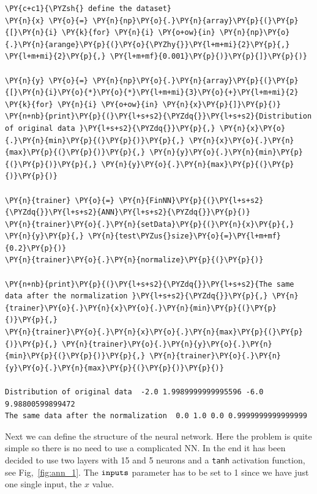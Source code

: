 \begin{tcolorbox}[breakable, size=fbox, boxrule=1pt, pad at break*=1mm,colback=cellbackground, colframe=cellborder]
\begin{Verbatim}[commandchars=\\\{\}]
\PY{c+c1}{\PYZsh{} define the dataset}
\PY{n}{x} \PY{o}{=} \PY{n}{np}\PY{o}{.}\PY{n}{array}\PY{p}{(}\PY{p}{[}\PY{n}{i} \PY{k}{for} \PY{n}{i} \PY{o+ow}{in} \PY{n}{np}\PY{o}{.}\PY{n}{arange}\PY{p}{(}\PY{o}{\PYZhy{}}\PY{l+m+mi}{2}\PY{p}{,} \PY{l+m+mi}{2}\PY{p}{,} \PY{l+m+mf}{0.001}\PY{p}{)}\PY{p}{]}\PY{p}{)}
	
\PY{n}{y} \PY{o}{=} \PY{n}{np}\PY{o}{.}\PY{n}{array}\PY{p}{(}\PY{p}{[}\PY{n}{i}\PY{o}{*}\PY{o}{*}\PY{l+m+mi}{3}\PY{o}{+}\PY{l+m+mi}{2} \PY{k}{for} \PY{n}{i} \PY{o+ow}{in} \PY{n}{x}\PY{p}{]}\PY{p}{)}
\PY{n+nb}{print}\PY{p}{(}\PY{l+s+s2}{\PYZdq{}}\PY{l+s+s2}{Distribution of original data }\PY{l+s+s2}{\PYZdq{}}\PY{p}{,} \PY{n}{x}\PY{o}{.}\PY{n}{min}\PY{p}{(}\PY{p}{)}\PY{p}{,} \PY{n}{x}\PY{o}{.}\PY{n}{max}\PY{p}{(}\PY{p}{)}\PY{p}{,} \PY{n}{y}\PY{o}{.}\PY{n}{min}\PY{p}{(}\PY{p}{)}\PY{p}{,} \PY{n}{y}\PY{o}{.}\PY{n}{max}\PY{p}{(}\PY{p}{)}\PY{p}{)}
	
\PY{n}{trainer} \PY{o}{=} \PY{n}{FinNN}\PY{p}{(}\PY{l+s+s2}{\PYZdq{}}\PY{l+s+s2}{ANN}\PY{l+s+s2}{\PYZdq{}}\PY{p}{)}
\PY{n}{trainer}\PY{o}{.}\PY{n}{setData}\PY{p}{(}\PY{n}{x}\PY{p}{,} \PY{n}{y}\PY{p}{,} \PY{n}{test\PYZus{}size}\PY{o}{=}\PY{l+m+mf}{0.2}\PY{p}{)}
\PY{n}{trainer}\PY{o}{.}\PY{n}{normalize}\PY{p}{(}\PY{p}{)}
	
\PY{n+nb}{print}\PY{p}{(}\PY{l+s+s2}{\PYZdq{}}\PY{l+s+s2}{The same data after the normalization }\PY{l+s+s2}{\PYZdq{}}\PY{p}{,} \PY{n}{trainer}\PY{o}{.}\PY{n}{x}\PY{o}{.}\PY{n}{min}\PY{p}{(}\PY{p}{)}\PY{p}{,} 
\PY{n}{trainer}\PY{o}{.}\PY{n}{x}\PY{o}{.}\PY{n}{max}\PY{p}{(}\PY{p}{)}\PY{p}{,} \PY{n}{trainer}\PY{o}{.}\PY{n}{y}\PY{o}{.}\PY{n}{min}\PY{p}{(}\PY{p}{)}\PY{p}{,} \PY{n}{trainer}\PY{o}{.}\PY{n}{y}\PY{o}{.}\PY{n}{max}\PY{p}{(}\PY{p}{)}\PY{p}{)}

Distribution of original data  -2.0 1.9989999999995596 -6.0 9.98800599899472
The same data after the normalization  0.0 1.0 0.0 0.9999999999999999
\end{Verbatim}
\end{tcolorbox}

Next we can define the structure of the neural network. Here the problem is quite simple so there is no need to use a complicated NN.
In the end it has been decided to use two layers with 15 and 5 neurons and a
\texttt{tanh} activation function, see Fig,~\ref{fig:ann_1}. The \(\tt{inputs}\) parameter has to be
set to 1 since we have just one single input, the \(x\) value.


